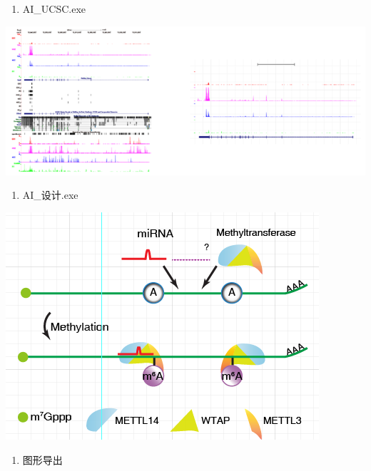 \documentclass[]{article}
\providecommand{\tightlist}{%
  \setlength{\itemsep}{0pt}\setlength{\parskip}{0pt}}
\numberwithin{figure}{section}
\numberwithin{table}{section}
\theoremstyle{definition}
\theoremstyle{definition}
\theoremstyle{definition}
\theoremstyle{remark}
\begin{document}
\begin{enumerate}
\def\labelenumi{\arabic{enumi}.}
\setcounter{enumi}{2}
\tightlist
\item
  AI\_UCSC.exe
\end{enumerate}

\begin{center}\includegraphics[width=0.95\linewidth,height=0.7\textheight,keepaspectratio]{images/articlePic2nd_5_ucsc} \end{center}

\begin{enumerate}
\def\labelenumi{\arabic{enumi}.}
\setcounter{enumi}{3}
\tightlist
\item
  AI\_设计.exe
\end{enumerate}

\begin{center}\includegraphics[width=0.95\linewidth,height=0.7\textheight,keepaspectratio]{images/articlePic2nd_6_model} \end{center}

\begin{enumerate}
\def\labelenumi{\arabic{enumi}.}
\setcounter{enumi}{4}
\tightlist
\item
  图形导出
\end{enumerate}
\end{document}
